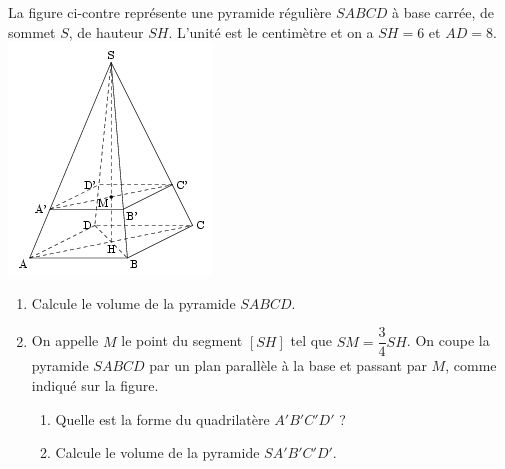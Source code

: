 
\begin{multicols}{2}
La figure ci-contre représente une pyramide
régulière $SABCD$ à base carrée, de sommet $S$, de hauteur
$SH$. L'unité est le centimètre et on a $SH=6$ et $AD=8$.\\
\includegraphics[scale=1]{RepS-45.png} 
\end{multicols}

\begin{enumerate}
\item Calcule le volume de la pyramide $SABCD$.
\item On appelle $M$ le point du segment $[SH]$ tel que
$SM=\dfrac34SH$. On coupe la pyramide $SABCD$ par un plan
parallèle à la base et passant par $M$, comme indiqué sur la figure.
\begin{enumerate}
\item Quelle est la forme du quadrilatère $A'B'C'D'$ ?
\item Calcule le volume de la pyramide $SA'B'C'D'$.
\end{enumerate} 
\end{enumerate}

